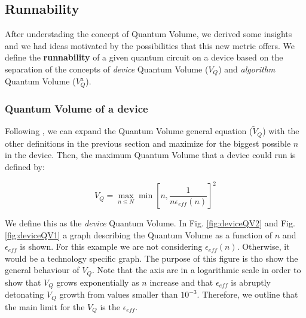 \documentclass[11pt]{article}
\begin{document}
\subsection{Runnability}
\label{sec:org87801cf}

After understading the concept of Quantum Volume, we derived some insights and we had ideas motivated by the possibilities that this new metric offers. 
We define the \textbf{runnability} of a given quantum circuit on a device based on the separation of the concepts of \emph{device} Quantum Volume (\(V_Q\)) and \emph{algorithm} Quantum Volume (\(V^a_Q\)).


\subsubsection{Quantum Volume of a device}
\label{sec:org143cdaa}

Following \cite{Bishop_2017,Moll_2018}, we can expand the Quantum Volume general equation (\(\tilde{V}_Q\)) with the other definitions in the previous section and maximize for the biggest possible \(n\) in the device. 
Then, the maximum Quantum Volume that a device could run is defined by:

$$V_Q = \max_{n \le N} \min \left[ n,\frac{1}{n \epsilon_{eff} (n)}\right]^2$$

We define this as the \emph{device} Quantum Volume. 
In Fig. \ref{fig:deviceQV2} and Fig. \ref{fig:deviceQV1} a graph describing the Quantum Volume as a function of \(n\) and \(\epsilon_{eff}\) is shown.
For this example we are not considering \(\epsilon_{eff} (n)\).
Otherwise, it would be a technology specific graph.
The purpose of this figure is tho show the general behaviour of \(V_Q\).
Note that the axis are in a logarithmic scale in order to show that \(V_Q\) grows exponentially as \(n\) increase and that \(\epsilon_{eff}\) is abruptly detonating \(V_Q\) growth from values smaller than \(10^{-3}\).
Therefore, we outline that the main limit for the \(V_Q\) is the \(\epsilon_{eff}\).

\end{document}
